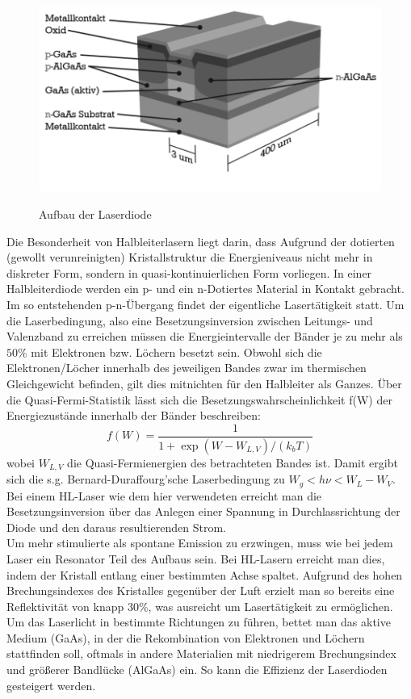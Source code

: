\documentclass[twoside,colorback,accentcolor=tud4c,11pt]{tudreport}
\begin{document}
\begin{figure}[H]
\centering
   	\begin{minipage}[b]{0.6\textwidth}
   	\includegraphics[width=\textwidth]{graphics/diodaufb.PNG}
  	\label{diau}
   	\end{minipage}
\caption{Aufbau der Laserdiode}\cite{anl} 	
\end{figure}
Die Besonderheit von Halbleiterlasern liegt darin, dass Aufgrund der dotierten (gewollt verunreinigten) Kristallstruktur die Energieniveaus nicht mehr in diskreter Form, sondern in quasi-kontinuierlichen Form vorliegen. In einer Halbleiterdiode werden ein p- und ein n-Dotiertes Material in Kontakt gebracht. Im so entstehenden p-n-Übergang findet der eigentliche Lasertätigkeit statt. Um die Laserbedingung, also eine Besetzungsinversion zwischen Leitungs- und Valenzband zu erreichen müssen die Energieintervalle der Bänder je zu mehr als $50\%$ mit Elektronen bzw. Löchern besetzt sein. Obwohl sich die Elektronen/Löcher innerhalb des jeweiligen Bandes zwar im thermischen Gleichgewicht befinden, gilt dies mitnichten für den Halbleiter als Ganzes. Über die Quasi-Fermi-Statistik lässt sich die Besetzungswahrscheinlichkeit f(W) der Energiezustände innerhalb der Bänder beschreiben:
\begin{equation}
f(W)=\frac{1}{1+\exp\left(W-W_{L,V}\right)/ (k_{b}T)}
\end{equation}
wobei $W_{L,V}$ die Quasi-Fermienergien des betrachteten Bandes ist. Damit ergibt sich die s.g. Bernard-Duraffourg'sche Laserbedingung zu $W_{g}<h\nu <W_{L}-W_{V}$. Bei einem HL-Laser wie dem hier verwendeten erreicht man die Besetzungsinversion über das Anlegen einer Spannung in Durchlassrichtung der Diode und den daraus resultierenden Strom. \\
Um mehr stimulierte als spontane Emission zu erzwingen, muss wie bei jedem Laser ein Resonator Teil des Aufbaus sein. Bei HL-Lasern erreicht man dies, indem der Kristall entlang einer bestimmten Achse spaltet. Aufgrund des hohen Brechungsindexes des Kristalles gegenüber der Luft erzielt man so bereits eine Reflektivität von knapp 30\%, was ausreicht um Lasertätigkeit zu ermöglichen. Um das Laserlicht in bestimmte Richtungen zu führen, bettet man das aktive Medium (GaAs), in der die Rekombination von Elektronen und Löchern stattfinden soll, oftmals in andere Materialien mit niedrigerem Brechungsindex und größerer Bandlücke (AlGaAs) ein. So kann die Effizienz der Laserdioden gesteigert werden.\\
\end{document}
